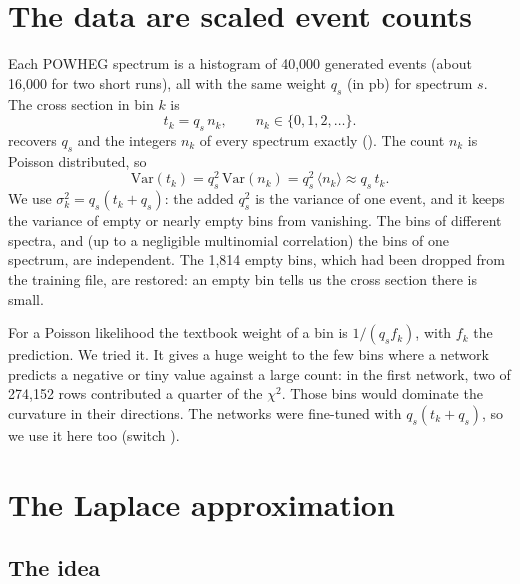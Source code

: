 \section{The data are scaled event counts}
\label{sec:counts}

Each POWHEG spectrum is a histogram of 40,000 generated events (about 16,000 for two short
runs), all with the same weight
$q_s$ (in pb) for spectrum $s$. The cross section in bin $k$ is
\begin{equation}
  t_k = q_s\, n_k , \qquad n_k \in \{0, 1, 2, \ldots\} .
\end{equation}
 recovers $q_s$ and the integers $n_k$ of every spectrum exactly
(). The count $n_k$ is Poisson distributed, so
\begin{equation}
  \mathrm{Var}(t_k) = q_s^2\, \mathrm{Var}(n_k) = q_s^2\, \langle n_k\rangle \approx q_s\, t_k .
\end{equation}
We use $\sigma_k^2 = q_s(t_k + q_s)$: the added $q_s^2$ is the variance of one event, and it
keeps the variance of empty or nearly empty bins from vanishing. The bins of different
spectra, and (up to a negligible multinomial correlation) the bins of one spectrum, are
independent. The 1,814 empty bins, which had been dropped from the training file, are
restored: an empty bin tells us the cross section there is small.

\begin{aside}
For a Poisson likelihood the textbook weight of a bin is $1/(q_s f_k)$, with $f_k$ the
prediction. We tried it. It gives a huge weight to the few bins where a network predicts
a negative or tiny value against a large count: in the first network, two of 274,152 rows
contributed a quarter of the $\chi^2$. Those bins would dominate the curvature in their
directions. The networks were fine-tuned with $q_s(t_k + q_s)$, so we use it here too
(switch ).
\end{aside}

\section{The Laplace approximation}

\subsection{The idea}

